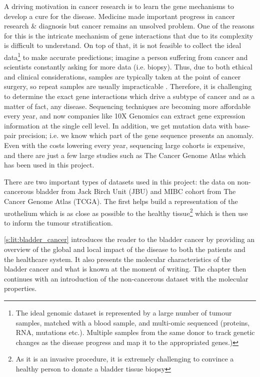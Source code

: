 A driving motivation in cancer research is to learn the gene mechanisms to develop a cure for the disease. Medicine made important progress in cancer research \& diagnosis but cancer remains an unsolved problem. One of the reasons for this is the intricate mechanism of gene interactions that due to its complexity is difficult to understand. On top of that, it is not feasible to collect the ideal data\footnote{The ideal genomic dataset is represented by a large number of tumour samples, matched with a blood sample, and multi-omic sequenced (proteins, RNA, mutations etc.). Multiple samples from the same donor to track genetic changes as the disease progress and map it to the appropriated genes.)} to make accurate predictions; imagine a person suffering from cancer and scientists constantly asking for more data (i.e. biopsy). Thus, due to both ethical and clinical considerations, samples are typically taken at the point of cancer surgery, so repeat samples are usually impracticable . Therefore, it is challenging to determine the exact gene interactions which drive a subtype of cancer and as a matter of fact, any disease. 
Sequencing techniques are becoming more affordable every year, and now companies like 10X Genomics can extract gene expression information at the single cell level. In addition, we get mutation data with base-pair precision; i.e. we know which part of the gene sequence presents an anomaly. Even with the costs lowering every year, sequencing large cohorts is expensive, and there are just a few large studies such as The Cancer Genome Atlas which has been used in this project.

There are two important types of datasets used in this project: the data on non-cancerous bladder from Jack Birch Unit (JBU) and MIBC cohort from The Cancer Genome Atlas (TCGA). The first helps build a representation of the urothelium which is as close as possible to the healthy tissue\footnote{As it is an invasive procedure, it is extremely challenging to convince a healthy person to donate a bladder tissue biopsy} which is then use to inform the tumour stratification.

\cref{s:lit:bladder_cancer} introduces the reader to the bladder cancer by providing an overview of the global and local impact of the disease to both the patients and the healthcare system. It also presents the molecular characteristics of the bladder cancer and what is known at the moment of writing. The chapter then continues with an introduction of the non-cancerous dataset with the molecular properties.

